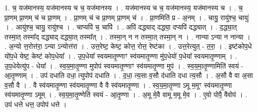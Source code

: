 \documentclass[17pt]{extarticle}
\begin{document}
1. च॒ यज॑मानस्य॒ यज॑मानस्य च च॒ यज॑मानस्य । . यज॑मानस्य च च॒ यज॑मानस्य॒ यज॑मानस्य च । . च॒ प्रा॒णम् प्रा॒णम् च॑ च प्रा॒णम् । . प्रा॒णम् च॑ च प्रा॒णम् प्रा॒णम् च॑ । . प्रा॒णमिति॑ प्र - अ॒नम् । . चायु॒ रायु॑श्च॒ चायुः॑ । . आयु॑श्च॒ चायु॒ रायु॑श्च । . चाप्यपि॑ च॒ चापि॑ । . अपि॑ दद्ध्याद् दद्ध्या॒ दप्यपि॑ दद्ध्यात् । . द॒द्ध्या॒त् तस्मा॒त् तस्मा᳚द् दद्ध्याद् दद्ध्या॒त् तस्मा᳚त् । . तस्मा॒न् न न तस्मा॒त् तस्मा॒न् न । . नान्या ऽन्या न नान्या । . अ॒न्यो त्त॒रोत्त॑रा॒ ऽन्या ऽन्योत्त॑रा । . उत्त॒रेष्ट॒ केष्ट॒ कोत्त॒ रोत्त॒ रेष्ट॑का । . उत्त॒रेत्युत् - त॒रा॒ । . इष्ट॑कोप॒धे यो॑प॒धे येष्ट॒ केष्ट॑ कोप॒धेया᳚ । . उ॒प॒धेया᳚ स्वयमातृ॒ण्णाꣳ स्व॑यमातृ॒ण्णा मु॑प॒धेयो॑ प॒धेया᳚ स्वयमातृ॒ण्णाम् । . उ॒प॒धेयेत्यु॑प - धेया᳚ । . स्व॒य॒मा॒तृ॒ण्णा मुपोप॑ स्वयमातृ॒ण्णाꣳ स्व॑यमातृ॒ण्णा मुप॑ । . स्व॒य॒मा॒तृ॒ण्णामिति॑ स्वयं - आ॒तृ॒ण्णाम् । . उप॑ दधाति दधा॒ त्युपोप॑ दधाति । . द॒धा॒ त्य॒सा व॒सौ द॑धाति दधा त्य॒सौ । . अ॒सौ वै वा अ॒सा व॒सौ वै । . वै स्व॑यमातृ॒ण्णा स्व॑यमातृ॒ण्णा वै वै स्व॑यमातृ॒ण्णा । . स्व॒य॒मा॒तृ॒ण्णा ऽमू म॒मूꣳ स्व॑यमातृ॒ण्णा स्व॑यमातृ॒ण्णा ऽमूम् । . स्व॒य॒मा॒तृ॒ण्णेति॑ स्वयं - आ॒तृ॒ण्णा । . अ॒मू मे॒वै वामू म॒मू मे॒व । . ए॒वो पोपै॒ वैवोप॑ । . उप॑ धत्ते धत्त॒ उपोप॑ धत्ते । \newline
\end{document}
